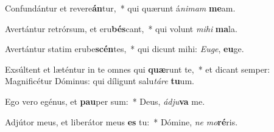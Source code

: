 \item Confundántur et revere\textbf{án}tur,~* qui quærunt á\textit{ni}\textit{mam} \textbf{me}am.
\item Avertántur retrórsum, et eru\textbf{bés}cant,~* qui volunt \textit{mi}\textit{hi} \textbf{ma}la.
\item Avertántur statim erube\textbf{scén}tes,~* qui dicunt mihi: \textit{Eu}\textit{ge}, \textbf{eu}ge.
\item Exsúltent et læténtur in te omnes qui \textbf{quæ}runt te,~* et dicant semper: Magnificétur Dóminus: qui díligunt salu\textit{tá}\textit{re} \textbf{tu}um.
\item Ego vero egénus, et \textbf{pau}per sum:~* Deus, \textit{ád}\textit{ju}\textbf{va} me.
\item Adjútor meus, et liberátor meus \textbf{es} tu:~* Dómine, \textit{ne} \textit{mo}\textbf{ré}ris.
